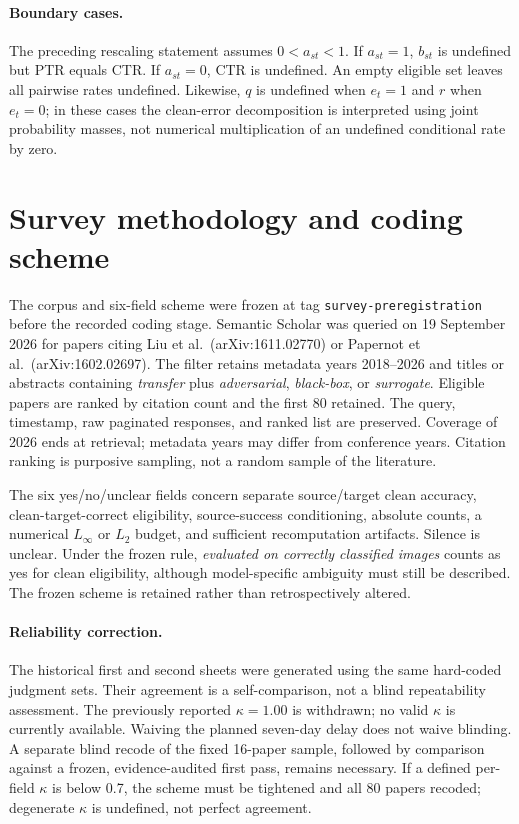 \documentclass[10pt,twocolumn]{article}
\begin{document}
\paragraph{Boundary cases.}
The preceding rescaling statement assumes $0<a_{st}<1$. If $a_{st}=1$, $b_{st}$ is undefined but PTR equals CTR. If $a_{st}=0$, CTR is undefined. An empty eligible set leaves all pairwise rates undefined.
Likewise, $q$ is undefined when $e_t=1$ and $r$ when $e_t=0$; in these cases the clean-error decomposition is interpreted using joint probability masses, not numerical multiplication of an undefined conditional rate by zero.

\section{Survey methodology and coding scheme}
The corpus and six-field scheme were frozen at tag \texttt{survey-preregistration} before the recorded coding stage. Semantic Scholar was queried on 19 September 2026 for papers citing Liu et al.\ (arXiv:1611.02770) or Papernot et al.\ (arXiv:1602.02697). The filter retains metadata years 2018--2026 and titles or abstracts containing \emph{transfer} plus \emph{adversarial}, \emph{black-box}, or \emph{surrogate}. Eligible papers are ranked by citation count and the first 80 retained. The query, timestamp, raw paginated responses, and ranked list are preserved. Coverage of 2026 ends at retrieval; metadata years may differ from conference years. Citation ranking is purposive sampling, not a random sample of the literature.

The six yes/no/unclear fields concern separate source/target clean accuracy, clean-target-correct eligibility, source-success conditioning, absolute counts, a numerical $L_\infty$ or $L_2$ budget, and sufficient recomputation artifacts. Silence is unclear. Under the frozen rule, \emph{evaluated on correctly classified images} counts as yes for clean eligibility, although model-specific ambiguity must still be described. The frozen scheme is retained rather than retrospectively altered.

\paragraph{Reliability correction.}
The historical first and second sheets were generated using the same hard-coded judgment sets. Their agreement is a self-comparison, not a blind repeatability assessment. The previously reported $\kappa=1.00$ is withdrawn; no valid $\kappa$ is currently available. Waiving the planned seven-day delay does not waive blinding. A separate blind recode of the fixed 16-paper sample, followed by comparison against a frozen, evidence-audited first pass, remains necessary. If a defined per-field $\kappa$ is below 0.7, the scheme must be tightened and all 80 papers recoded; degenerate $\kappa$ is undefined, not perfect agreement.
\end{document}

